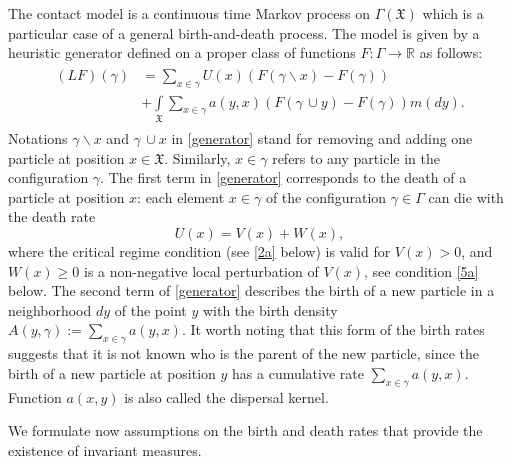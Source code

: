 \documentclass[a4paper,12pt]{article}
\newcommand{\Ga}{\Gamma}
\newcommand{\R}{{\mathbb R}}
\newcommand{\XXX}{{\mathfrak{X}}}
\begin{document}
The contact model is a continuous time Markov process on $\Gamma(\XXX)$ which is a
particular case of a general birth-and-death process.
The model is given by a heuristic
generator defined on a proper class of functions  $F:
\Gamma \to \R$ as follows:
\begin{align}
 \begin{aligned}\label{generator}
(L F)(\gamma) & = \sum_{ x \in \gamma} U(x) \left(F(\gamma \backslash x) - F(
\gamma)\right) \\
& +   \int\limits_{\XXX} \sum_{x \in \gamma}  a(y,x) (F(\gamma \,\cup
y ) - F(\gamma)) m(dy).
 \end{aligned}
 \end{align}
Notations $\gamma \backslash x$ and $\gamma \,\cup x$  in \eqref{generator} stand for removing and adding one particle at position $x \in \XXX$. Similarly, $x \in \gamma$ refers to any particle in the configuration $\gamma$.
The first term in \eqref{generator} corresponds to the death of a particle at position $x$: each element $x \in \gamma$ of the configuration $\gamma\in\Ga$ can die with the death rate
$$
U(x) = V(x)+ W(x),
$$ where the critical regime condition (see \eqref{2a} below) is valid  for $V(x) > 0$, and $W(x) \ge 0$ is a non-negative local perturbation of $V(x)$, see condition \eqref{5a} below. The second term of \eqref{generator} describes the birth of a new particle in a neighborhood $dy$ of the point $y$ with the
birth density $A(y,\gamma):=\sum_{x \in \gamma} a(y,x)$. It worth noting that this form of the birth rates suggests that it is not known who is the parent of the new particle, since the birth of a new particle at position $y$ has a cumulative rate $\sum_{x \in \gamma}  a(y,x)$.  Function $a(x,y)$ is also called the dispersal kernel.
\medskip


We formulate now assumptions on the birth and death rates that provide the existence of invariant measures.
\end{document}
